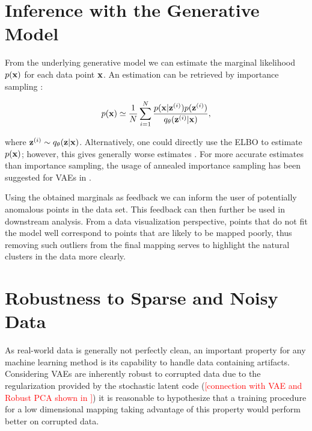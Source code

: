 \section{Inference with the Generative Model}
\label{section:inference_with_the_generative_model}

From the underlying generative model we can estimate the marginal likelihood $p(\mathbf{x})$ for each data point $\mathbf{x}$. An estimation can be retrieved by importance sampling \cite{stochastic_backpropagation}:

$$p(\mathbf{x}) \simeq \frac{1}{N} \sum_{i=1}^{N} \frac{p(\mathbf{x} \vert \mathbf{z}^{(i)}) p(\mathbf{z}^{(i)})}{q_{\theta}(\mathbf{z}^{(i)} \vert \mathbf{x})},$$

where $\mathbf{z}^{(i)} \sim q_{\theta}(\mathbf{z} \vert \mathbf{x})$. Alternatively, one could directly use the ELBO to estimate $p(\mathbf{x})$; however, this gives generally worse estimates \cite{ais_vae}. For more accurate estimates than importance sampling, the usage of annealed importance sampling \cite{ais} has been suggested for VAEs in \cite{ais_vae}.

Using the obtained marginals as feedback we can inform the user of potentially anomalous points in the data set. This feedback can then further be used in downstream analysis. From a data visualization perspective, points that do not fit the model well correspond to points that are likely to be mapped poorly, thus removing such outliers from the final mapping serves to highlight the natural clusters in the data more clearly.

\section{Robustness to Sparse and Noisy Data}
\label{section:robustness}


As real-world data is generally not perfectly clean, an important property for any machine learning method is its capability to handle data containing artifacts. Considering VAEs are inherently robust to corrupted data due to the regularization provided by the stochastic latent code (\textcolor{red}{[connection with VAE and Robust PCA \cite{rpca_1, rpca_2} shown in \citep{hidden_talents_of_the_vae}]}) it is reasonable to hypothesize that a training procedure for a low dimensional mapping taking advantage of this property would perform better on corrupted data.


